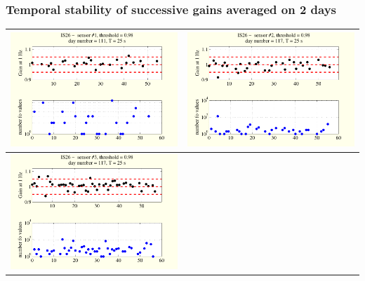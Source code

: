 \documentclass[handout,10pt]{beamer}
\begin{document}
\begin{frame}
\frametitle{Temporal stability of successive gains averaged on 2 days}
\begin{tabular}{c||c}
\includegraphics[scale=0.3]{evolutionon1atfreq1.pdf}
&
\includegraphics[scale=0.3]{evolutionon2atfreq1.pdf}
\\
\hline\hline
\includegraphics[scale=0.3]{evolutionon3atfreq1.pdf}

\end{tabular}
\end{frame}
\end{document}
